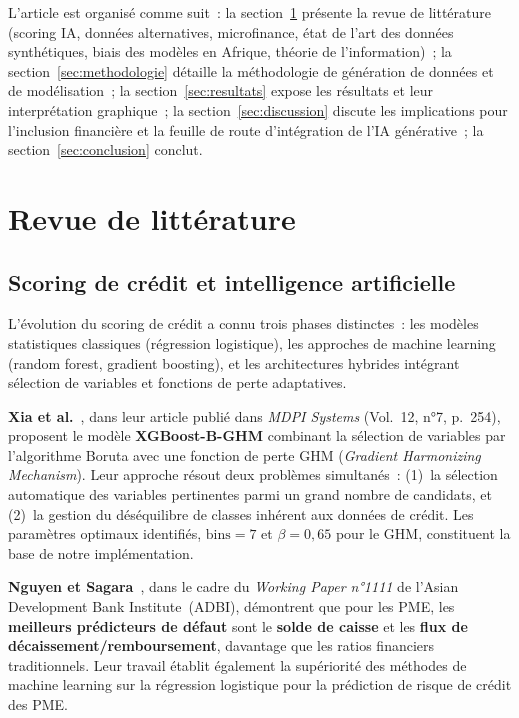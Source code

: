 \documentclass[12pt, a4paper, twocolumn]{article}
\begin{document}
L'article est organisé comme suit~: la section~\ref{sec:litterature} présente la revue de littérature (scoring IA, données alternatives, microfinance, état de l'art des données synthétiques, biais des modèles en Afrique, théorie de l'information)~; la section~\ref{sec:methodologie} détaille la méthodologie de génération de données et de modélisation~; la section~\ref{sec:resultats} expose les résultats et leur interprétation graphique~; la section~\ref{sec:discussion} discute les implications pour l'inclusion financière et la feuille de route d'intégration de l'IA générative~; la section~\ref{sec:conclusion} conclut.

\section{Revue de littérature}
\label{sec:litterature}

\subsection{Scoring de crédit et intelligence artificielle}
\label{subsec:scoring_ia}

L'évolution du scoring de crédit a connu trois phases distinctes~: les modèles statistiques classiques (régression logistique), les approches de machine learning (random forest, gradient boosting), et les architectures hybrides intégrant sélection de variables et fonctions de perte adaptatives.

\textbf{Xia et al.}~\cite{xia2024}, dans leur article publié dans \textit{MDPI Systems} (Vol.~12, n°7, p.~254), proposent le modèle \textbf{XGBoost-B-GHM} combinant la sélection de variables par l'algorithme Boruta avec une fonction de perte GHM (\textit{Gradient Harmonizing Mechanism}). Leur approche résout deux problèmes simultanés~: (1)~la sélection automatique des variables pertinentes parmi un grand nombre de candidats, et (2)~la gestion du déséquilibre de classes inhérent aux données de crédit. Les paramètres optimaux identifiés, $\text{bins}=7$ et $\beta=0{,}65$ pour le GHM, constituent la base de notre implémentation.

\textbf{Nguyen et Sagara}~\cite{nguyen2020}, dans le cadre du \textit{Working Paper n°1111} de l'Asian Development Bank Institute~(ADBI), démontrent que pour les PME, les \textbf{meilleurs prédicteurs de défaut} sont le \textbf{solde de caisse} et les \textbf{flux de décaissement/remboursement}, davantage que les ratios financiers traditionnels. Leur travail établit également la supériorité des méthodes de machine learning sur la régression logistique pour la prédiction de risque de crédit des PME.
\end{document}
